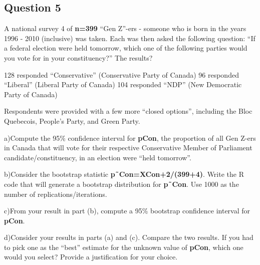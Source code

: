 \documentclass[
]{article}
\begin{document}
\hypertarget{question-5}{%
\subsection{Question 5}\label{question-5}}

A national survey 4 of \textbf{n=399} ``Gen Z''-ers - someone who is
born in the years 1996 - 2010 (inclusive) was taken. Each was then asked
the following question: ``If a federal election were held tomorrow,
which one of the following parties would you vote for in your
constituency?'' The results?

128 responded ``Conservative'' (Conservative Party of Canada) 96
responded ``Liberal'' (Liberal Party of Canada) 104 responded ``NDP''
(New Democratic Party of Canada)

Respondents were provided with a few more ``closed options'', including
the Bloc Quebecois, People's Party, and Green Party.

a)Compute the 95\% confidence interval for \textbf{pCon}, the proportion
of all Gen Z-ers in Canada that will vote for their respective
Conservative Member of Parliament candidate/constituency, in an election
were ``held tomorrow''.

b)Consider the bootstrap statistic \textbf{p˜Con=XCon+2/(399+4)}. Write
the R code that will generate a bootstrap distribution for
\textbf{p˜Con}. Use 1000 as the number of replications/iterations.

c)From your result in part (b), compute a 95\% bootstrap confidence
interval for \textbf{pCon}.

d)Consider your results in parts (a) and (c). Compare the two results.
If you had to pick one as the ``best'' estimate for the unknown value of
\textbf{pCon}, which one would you select? Provide a justification for
your choice.
\end{document}

